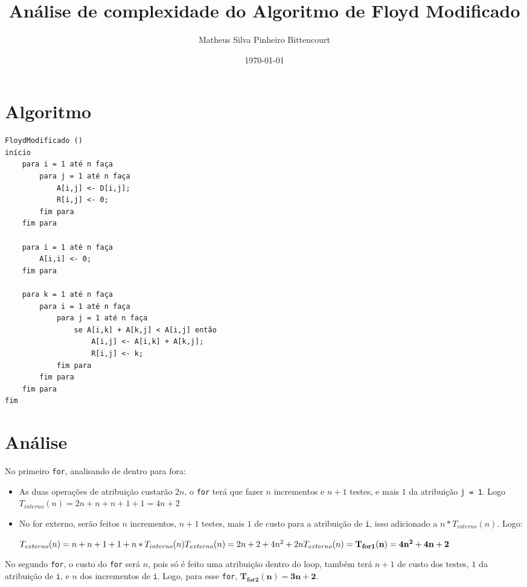\documentclass[a4paper, 12pt]{article}
\title{Análise de complexidade do Algoritmo de Floyd Modificado}
\author{Matheus Silva Pinheiro Bittencourt}
\date{\today}
\begin{document}
\maketitle

\section*{Algoritmo}
\begin{verbatim}
FloydModificado ()
início
    para i = 1 até n faça
        para j = 1 até n faça
            A[i,j] <- D[i,j];
            R[i,j] <- 0;
        fim para
    fim para

    para i = 1 até n faça
        A[i,i] <- 0;
    fim para

    para k = 1 até n faça
        para i = 1 até n faça
            para j = 1 até n faça
                se A[i,k] + A[k,j] < A[i,j] então
                    A[i,j] <- A[i,k] + A[k,j];
                    R[i,j] <- k;
            fim para
        fim para
    fim para
fim
\end{verbatim}

\section*{Análise}

No primeiro \verb|for|, analisando de dentro para fora:
\begin{itemize}
    \item As duas operações de atribuição custarão $2n$, o \verb|for| terá que
    fazer $n$ incrementos e $n+1$ testes, e mais $1$ da atribuição
    \verb|j = 1|. Logo $T_{interno}(n) = 2n + n + n + 1 + 1 = 4n + 2$
    \item No for externo, serão feitos $n$ incrementos, $n+1$ testes, mais $1$
    de custo para a atribuição de \verb|i|, isso adicionado a $n*T_{interno}(n)
    $. Logo:

    \begin{math}
    T_{externo}(n) = n + n + 1 + 1 + n*T_{interno}(n) \\
    T_{externo}(n) = 2n + 2 + 4n^2 + 2n \\
    T_{externo}(n) = \mathbf{T_{for1}(n) = 4n^2 + 4n + 2}
    \end{math}
\end{itemize}

No segundo \verb|for|, o custo do \verb|for| será $n$, pois só é feito uma
atribuição dentro do loop, também terá $n+1$ de custo dos testes, $1$ da
atribuição de \verb|i|, e $n$ dos incrementos de \verb|i|. Logo, para esse
\verb|for|, $\mathbf{T_{for2}(n) = 3n + 2}$.
\end{document}
